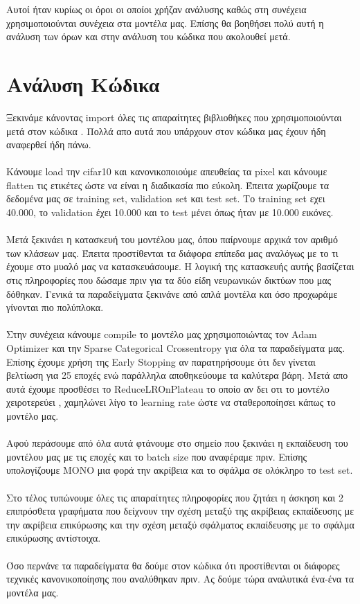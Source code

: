 \documentclass[11pt, letterpaper]{article}
\begin{document}
Αυτοί ήταν κυρίως οι όροι οι οποίοι χρήζαν ανάλυσης καθώς στη συνέχεια χρησιμοποιούνται συνέχεια στα μοντέλα μας. Επίσης θα βοηθήσει πολύ αυτή η ανάλυση των όρων και στην
ανάλυση του κώδικα που ακολουθεί μετά.

\newpage

\section*{Ανάλυση Κώδικα}
Ξεκινάμε κάνοντας import όλες τις απαραίτητες βιβλιοθήκες που χρησιμοποιούνται μετά στον κώδικα . Πολλά απο αυτά που υπάρχουν στον κώδικα μας έχουν ήδη 
αναφερθεί ήδη πάνω. \\ \\
Κάνουμε load την cifar10 και κανονικοποιούμε απευθείας τα pixel και κάνουμε flatten  τις ετικέτες ώστε να είναι η διαδικασία πιο εύκολη. Έπειτα χωρίζουμε τα δεδομένα μας σε training set, validation set
και test set. Το training set εχει 40.000, το validation έχει 10.000 και το test μένει όπως ήταν με 10.000 εικόνες. \\ \\
Μετά ξεκινάει η κατασκευή του μοντέλου μας, όπου παίρνουμε αρχικά τον αριθμό των κλάσεων μας. Έπειτα προστίθενται τα διάφορα επίπεδα μας αναλόγως με το τι έχουμε στο μυαλό μας να κατασκευάσουμε.
Η λογική της κατασκευής αυτής βασίζεται στις πληροφορίες που δώσαμε πριν για τα δύο είδη νευρωνικών δικτύων που μας δόθηκαν. Γενικά τα παραδείγματα ξεκινάνε από απλά μοντέλα και όσο προχωράμε γίνονται πιο πολύπλοκα.\\ \\
Στην συνέχεια κάνουμε compile το μοντέλο μας χρησιμοποιώντας τον Adam Optimizer και την Sparse Categorical Crossentropy για όλα τα παραδείγματα μας. Επίσης έχουμε χρήση της Early Stopping αν παρατηρήσουμε ότι δεν γίνεται
βελτίωση για 25 εποχές ενώ παράλληλα αποθηκεύουμε τα καλύτερα βάρη. Μετά απο αυτά έχουμε προσθέσει το ReduceLROnPlateau
το οποίο αν δει οτι το μοντέλο χειροτερεύει , χαμηλώνει λίγο το learning rate ώστε να σταθεροποίησει κάπως το μοντέλο μας. \\ \\
Αφού περάσουμε από όλα αυτά φτάνουμε στο σημείο που ξεκινάει η εκπαίδευση του μοντέλου μας με τις εποχές και το batch size που αναφέραμε πριν. Επίσης υπολογίζουμε ΜΟΝΟ μια φορά την ακρίβεια και το σφάλμα
σε ολόκληρο το test set.\\ \\
Στο τέλος τυπώνουμε όλες τις απαραίτητες πληροφορίες που ζητάει η άσκηση και 2 επιπρόσθετα γραφήματα που δείχνουν την σχέση μεταξύ της ακρίβειας εκπαίδευσης με την ακρίβεια επικύρωσης και την
σχέση μεταξύ σφάλματος εκπαίδευσης με το σφάλμα επικύρωσης αντίστοιχα. \\ \\ 
Όσο περνάνε τα παραδείγματα θα δούμε στον κώδικα ότι προστίθενται οι διάφορες τεχνικές κανονικοποίησης που αναλύθηκαν πριν. 
Ας δούμε τώρα αναλυτικά ένα-ένα τα μοντέλα μας.
\end{document}
